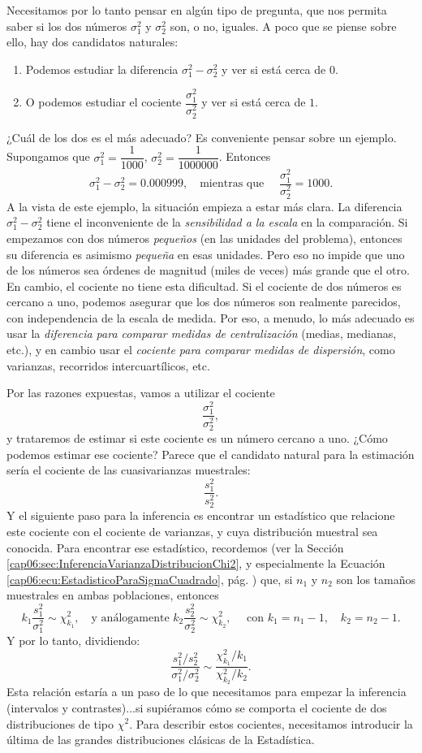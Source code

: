 Necesitamos por lo tanto pensar en algún tipo de pregunta, que nos permita saber si los dos números $\sigma_1^2$ y $\sigma_2^2$ son, o no, iguales. A poco que se piense sobre ello, hay dos candidatos naturales:
\begin{enumerate}
    \item Podemos estudiar la diferencia $\sigma_1^2-\sigma_2^2$ y ver si está cerca de $0$.
    \item O podemos estudiar el cociente $\dfrac{\sigma_1^2}{\sigma_2^2}$ y ver si está cerca de $1$.
\end{enumerate}
¿Cuál de los dos es el más adecuado? Es conveniente pensar sobre un ejemplo. Supongamos que $\sigma_1^2=\dfrac{1}{1000}$, $\sigma_2^2=\dfrac{1}{1000000}$. Entonces
    \[\sigma_1^2-\sigma_2^2=0.000999,\quad\mbox{mientras que }\quad\dfrac{\sigma_1^2}{\sigma_2^2}=1000.\]
A la vista de este ejemplo, la situación empieza a estar más clara. La diferencia  $\sigma_1^2-\sigma_2^2$ tiene el inconveniente de la {\em sensibilidad a la escala} en la comparación. Si empezamos con dos números {\em pequeños} (en las unidades del problema), entonces su diferencia es asimismo {\em pequeña} en esas unidades. Pero eso no impide que uno de los números sea órdenes de magnitud (miles de veces) más grande que el otro. En cambio, el cociente no tiene esta dificultad. Si el cociente de dos números es cercano a uno, podemos asegurar que los dos números son realmente parecidos, con independencia de la escala de medida. Por eso, a menudo, lo más adecuado es usar la {\em diferencia para comparar medidas de centralización} (medias, medianas, etc.), y en cambio usar el {\em cociente para comparar medidas de dispersión}, como varianzas, recorridos intercuartílicos, etc.

Por las razones expuestas, vamos a utilizar el cociente
    \[\dfrac{\sigma_1^2}{\sigma_2^2},\]
y trataremos de estimar si este cociente es un número cercano a uno. ¿Cómo podemos estimar ese cociente? Parece que el candidato natural para la estimación sería el cociente de las cuasivarianzas muestrales:
    \[\dfrac{s_1^2}{s_2^2}.\]
Y el siguiente paso para la inferencia es encontrar un estadístico que relacione este cociente con el cociente de varianzas, y cuya distribución muestral sea conocida. Para encontrar ese estadístico, recordemos (ver la Sección \ref{cap06:sec:InferenciaVarianzaDistribucionChi2}, y especialmente la Ecuación \ref{cap06:ecu:EstadisticoParaSigmaCuadrado}, pág. \pageref{cap06:ecu:EstadisticoParaSigmaCuadrado}) que, si $n_1$ y $n_2$ son los tamaños muestrales en ambas poblaciones, entonces
    \[k_1\dfrac{s_1^2}{\sigma_1^2}\sim\chi^2_{k_1},\quad\mbox{y análogamente }k_2\dfrac{s_2^2}{\sigma_2^2}\sim\chi^2_{k_2},\quad\mbox{ con }k_1=n_1-1,\quad k_2=n_2-1.\]
Y por lo tanto, dividiendo:
    \[\dfrac{s_1^2/s_2^2}{\sigma_1^2/\sigma_2^2}\sim\dfrac{\chi^2_{k_1}/k_1}{\chi^2_{k_2}/k_2}.\]
Esta relación estaría a un paso de lo que necesitamos para empezar la inferencia (intervalos y contrastes)...si supiéramos cómo se comporta el cociente de dos distribuciones de tipo $\chi^2$. Para describir estos cocientes, necesitamos introducir la última de las grandes distribuciones clásicas de la Estadística.

